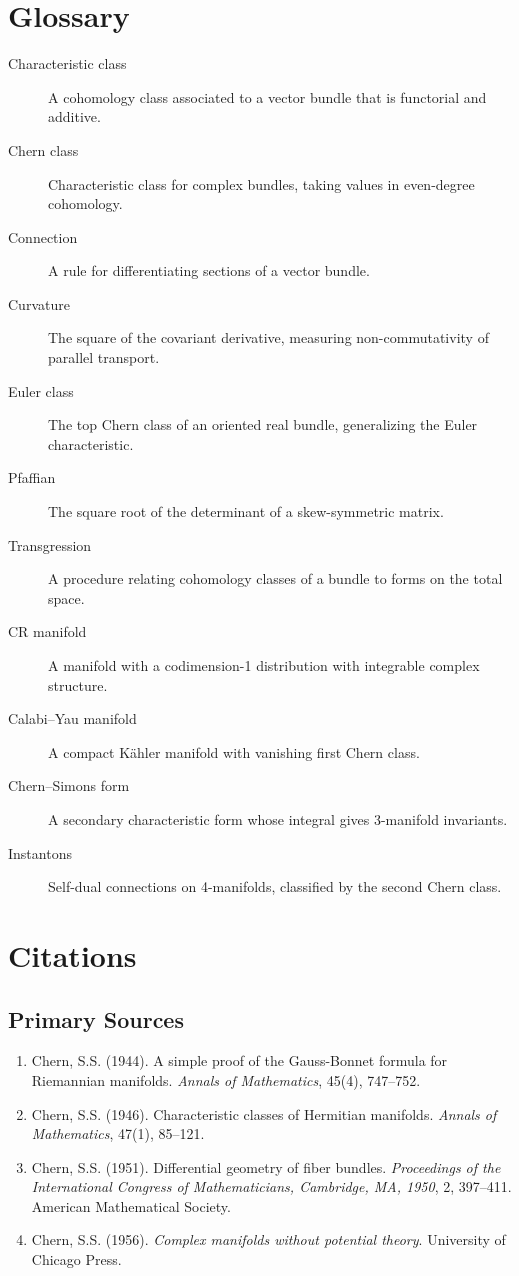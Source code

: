 \section*{Glossary}
\begin{description}
    \item[Characteristic class] A cohomology class associated to a vector bundle that is functorial and additive.
    \item[Chern class] Characteristic class for complex bundles, taking values in even-degree cohomology.
    \item[Connection] A rule for differentiating sections of a vector bundle.
    \item[Curvature] The square of the covariant derivative, measuring non-commutativity of parallel transport.
    \item[Euler class] The top Chern class of an oriented real bundle, generalizing the Euler characteristic.
    \item[Pfaffian] The square root of the determinant of a skew-symmetric matrix.
    \item[Transgression] A procedure relating cohomology classes of a bundle to forms on the total space.
    \item[CR manifold] A manifold with a codimension-1 distribution with integrable complex structure.
    \item[Calabi--Yau manifold] A compact K\"{a}hler manifold with vanishing first Chern class.
    \item[Chern--Simons form] A secondary characteristic form whose integral gives 3-manifold invariants.
    \item[Instantons] Self-dual connections on 4-manifolds, classified by the second Chern class.
\end{description}

\section{Citations}

\subsection*{Primary Sources}
\begin{enumerate}
    \item Chern, S.S. (1944). A simple proof of the Gauss-Bonnet formula for Riemannian manifolds. \textit{Annals of Mathematics}, 45(4), 747--752.
    \item Chern, S.S. (1946). Characteristic classes of Hermitian manifolds. \textit{Annals of Mathematics}, 47(1), 85--121.
    \item Chern, S.S. (1951). Differential geometry of fiber bundles. \textit{Proceedings of the International Congress of Mathematicians, Cambridge, MA, 1950}, 2, 397--411. American Mathematical Society.
    \item Chern, S.S. (1956). \textit{Complex manifolds without potential theory}. University of Chicago Press.
\end{enumerate}

